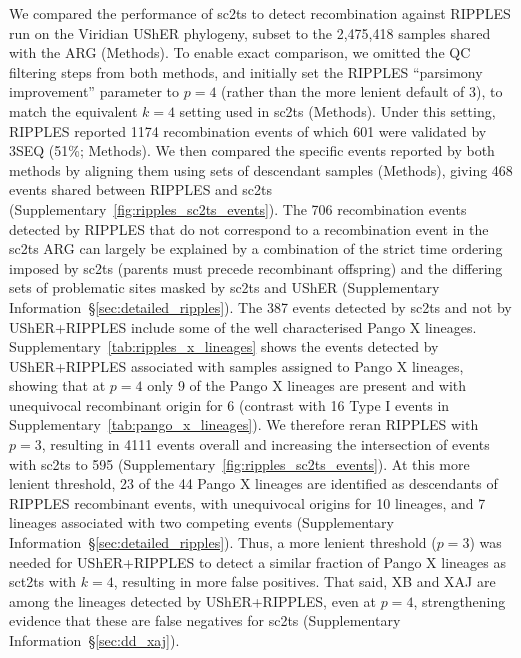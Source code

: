 \documentclass[12pt]{article}
\newcommand{\supref}[1]{Supplementary Information~\S\ref{#1}}
\newcommand{\siref}[1]{Supplementary~\ref{#1}}
\begin{document}
We compared the performance of sc2ts to detect recombination
against RIPPLES run on the Viridian UShER phylogeny,
subset to the 2,475,418 samples shared with the ARG (Methods).
To enable exact comparison, we omitted the QC filtering steps from both
methods, and initially set the RIPPLES ``parsimony improvement''
parameter to $p=4$ (rather than the more lenient default of 3),
to match the equivalent $k=4$ setting used in sc2ts (Methods).
Under this setting,
RIPPLES reported 1174 recombination events of which
601 were validated by 3SEQ (51\%; Methods).
We then compared
the specific events reported by both methods by aligning them
using sets of descendant samples (Methods),
giving 468 events shared between RIPPLES and sc2ts (\siref{fig:ripples_sc2ts_events}).
The 706 recombination events detected by RIPPLES that do not
correspond to a recombination event in the sc2ts ARG can largely
be explained by a combination
of the strict time ordering imposed by sc2ts
(parents must precede recombinant offspring)
and the differing sets of problematic sites masked
by sc2ts and UShER
(\supref{sec:detailed_ripples}).
The 387 events detected by sc2ts and not by UShER+RIPPLES
 include some of the well characterised Pango X lineages.
\siref{tab:ripples_x_lineages} shows the events detected
by UShER+RIPPLES associated with samples assigned to Pango X
lineages, showing that at $p=4$
only 9 of the Pango X lineages are present and
with unequivocal recombinant origin for 6
(contrast with 16 Type I events in \siref{tab:pango_x_lineages}).
We therefore reran RIPPLES with $p=3$, resulting in 4111 events overall
and increasing the intersection of events with sc2ts to 595
(\siref{fig:ripples_sc2ts_events}).
At this more lenient threshold, 23 of the 44 Pango X lineages
are identified as descendants of RIPPLES recombinant events,
with unequivocal origins for 10 lineages, and
7 lineages associated with two competing events
(\supref{sec:detailed_ripples}).
Thus, a more lenient threshold ($p=3$) was needed for UShER+RIPPLES to detect a
similar fraction of Pango X lineages as sct2ts with $k=4$, resulting in more
false positives. That said, XB and XAJ are among the lineages detected by
UShER+RIPPLES, even at $p=4$, strengthening evidence that these are false
negatives for sc2ts (\supref{sec:dd_xaj}).
\end{document}
